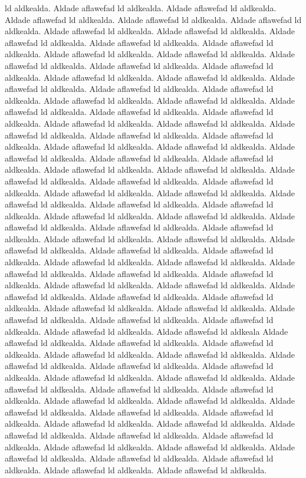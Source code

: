ld aldkealda. Aldade aflawefad ld aldkealda. Aldade aflawefad ld aldkealda. Aldade aflawefad
ld aldkealda. Aldade aflawefad ld aldkealda. Aldade aflawefad ld aldkealda. Aldade aflawefad
ld aldkealda. Aldade aflawefad ld aldkealda. Aldade aflawefad ld aldkealda. Aldade aflawefad
ld aldkealda. Aldade aflawefad ld aldkealda. Aldade aflawefad ld aldkealda. Aldade aflawefad
ld aldkealda. 
Aldade aflawefad ld aldkealda. Aldade aflawefad ld aldkealda. Aldade aflawefad
ld aldkealda. Aldade aflawefad ld aldkealda. Aldade aflawefad ld aldkealda. Aldade aflawefad
ld aldkealda. Aldade aflawefad ld aldkealda. Aldade aflawefad ld aldkealda. Aldade aflawefad
ld aldkealda. Aldade aflawefad ld aldkealda. Aldade aflawefad ld aldkealda. Aldade aflawefad
ld aldkealda. Aldade aflawefad ld aldkealda. Aldade aflawefad ld aldkealda. Aldade aflawefad
ld aldkealda. Aldade aflawefad ld aldkealda. Aldade aflawefad ld aldkealda. Aldade aflawefad
ld aldkealda. Aldade aflawefad ld aldkealda. Aldade aflawefad ld aldkealda. Aldade aflawefad
ld aldkealda. Aldade aflawefad ld aldkealda. Aldade aflawefad ld aldkealda. Aldade aflawefad
ld aldkealda. Aldade aflawefad ld aldkealda. Aldade aflawefad ld aldkealda. Aldade aflawefad
ld aldkealda. Aldade aflawefad ld aldkealda. Aldade aflawefad ld aldkealda. Aldade aflawefad
ld aldkealda. 
Aldade aflawefad ld aldkealda. Aldade aflawefad ld aldkealda. Aldade aflawefad
ld aldkealda. Aldade aflawefad ld aldkealda. Aldade aflawefad ld aldkealda. Aldade aflawefad
ld aldkealda. Aldade aflawefad ld aldkealda. Aldade aflawefad ld aldkealda. Aldade aflawefad
ld aldkealda. Aldade aflawefad ld aldkealda. Aldade aflawefad ld aldkealda. Aldade aflawefad
ld aldkealda. Aldade aflawefad ld aldkealda. Aldade aflawefad ld aldkealda. Aldade aflawefad
ld aldkealda. Aldade aflawefad ld aldkealda. Aldade aflawefad ld aldkealda. Aldade aflawefad
ld aldkealda. Aldade aflawefad ld aldkealda. Aldade aflawefad ld aldkealda. Aldade aflawefad
ld aldkealda. Aldade aflawefad ld aldkealda. Aldade aflawefad ld aldkealda. Aldade aflawefad
ld aldkealda. Aldade aflawefad ld aldkealda. Aldade aflawefad ld aldkealda. Aldade aflawefad
ld aldkealda. Aldade aflawefad ld aldkealda. Aldade aflawefad ld aldkealda. Aldade aflawefad
ld aldkeala   
Aldade aflawefad ld aldkealda. Aldade aflawefad ld aldkealda. Aldade aflawefad
ld aldkealda. Aldade aflawefad ld aldkealda. Aldade aflawefad ld aldkealda. Aldade aflawefad
ld aldkealda. Aldade aflawefad ld aldkealda. Aldade aflawefad ld aldkealda. Aldade aflawefad
ld aldkealda. Aldade aflawefad ld aldkealda. Aldade aflawefad ld aldkealda. Aldade aflawefad
ld aldkealda. Aldade aflawefad ld aldkealda. Aldade aflawefad ld aldkealda. Aldade aflawefad
ld aldkealda. Aldade aflawefad ld aldkealda. Aldade aflawefad ld aldkealda. Aldade aflawefad
ld aldkealda. Aldade aflawefad ld aldkealda. Aldade aflawefad ld aldkealda. Aldade aflawefad
ld aldkealda. Aldade aflawefad ld aldkealda. Aldade aflawefad ld aldkealda. Aldade aflawefad
ld aldkealda. Aldade aflawefad ld aldkealda. Aldade aflawefad ld aldkealda. Aldade aflawefad
ld aldkealda. Aldade aflawefad ld aldkealda. Aldade aflawefad ld aldkealda. Aldade aflawefad
ld aldkealda. 
